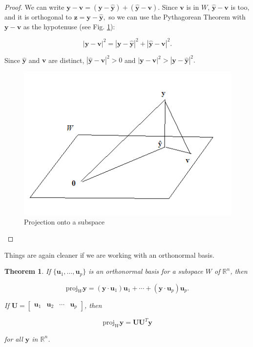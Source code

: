 \documentclass[
]{book}
\newtheorem{theorem}{Theorem}[chapter]
\theoremstyle{definition}
\theoremstyle{definition}
\theoremstyle{definition}
\theoremstyle{definition}
\theoremstyle{remark}
\begin{document}
\begin{proof}

We can write \(\mathbf{y}-\mathbf{v}=(\mathbf{y}-\hat{\mathbf{y}})+(\hat{\mathbf{y}}-\mathbf{v})\). Since \(\mathbf{v}\) is in \(W\), \(\hat{\mathbf{y}}-\mathbf{v}\) is too, and it is orthogonal to \(\mathbf{z}=\mathbf{y}-\hat{\mathbf{y}},\) so we can use the Pythagorean Theorem with \(\mathbf{y}-\mathbf{v}\) as the hypotenuse (see Fig. \ref{fig:yhat}):

\[|\mathbf{y}-\mathbf{v}|^2=|\mathbf{y}-\hat{\mathbf{y}}|^2+|\hat{\mathbf{y}}-\mathbf{v}|^2.\]

Since \(\hat{\mathbf{y}}\) and \(\mathbf{v}\) are distinct, \(|\hat{\mathbf{y}}-\mathbf{v}|^2>0\) and \(|\mathbf{y}-\mathbf{v}|^2>|\mathbf{y}-\hat{\mathbf{y}}|^2.\)

\begin{figure}

{\centering \includegraphics[width=0.6\linewidth]{images/yhat} 

}

\caption{Projection onto a subspace}\label{fig:yhat}
\end{figure}

\end{proof}

Things are again cleaner if we are working with an orthonormal basis.

\begin{theorembox}

\begin{theorem}
\protect\hypertarget{thm:Oproj}{}\label{thm:Oproj}If \(\{\mathbf{u}_1,\dots,\mathbf{u}_p\}\) is an orthonormal basis for a subspace \(W\) of \(\mathbb{R}^n\), then

\[\text{proj}_W\mathbf{y}=(\mathbf{y}\cdot\mathbf{u}_1)\mathbf{u}_1+\cdots+(\mathbf{y}\cdot\mathbf{u}_p)\mathbf{u}_p.\]

If \(\mathbf{U}=\begin{bmatrix}\mathbf{u}_1 & \mathbf{u}_2 & \cdots & \mathbf{u}_p\end{bmatrix}\), then

\[\text{proj}_W\mathbf{y}=\mathbf{U}\mathbf{U}^T\mathbf{y}\]

for all \(\mathbf{y}\) in \(\mathbb{R}^n\).
\end{theorem}

\end{theorembox}
\end{document}
